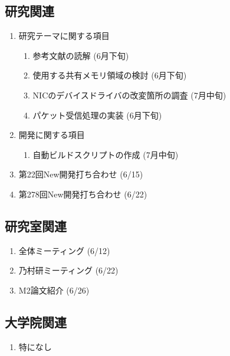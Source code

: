 \documentclass[fleqn, 14pt]{extarticle}
\begin{document}
\subsection{研究関連}
\label{sec-4-1}

\begin{enumerate}

\item 研究テーマに関する項目
\hfill
\begin{enumerate}


\item 参考文献の読解
\hfill
(6月下旬)

\item 使用する共有メモリ領域の検討
\hfill
(6月下旬)

\item NICのデバイスドライバの改変箇所の調査
\hfill
(7月中旬)

\item パケット受信処理の実装
\hfill
(6月下旬)
\end{enumerate}
\item 開発に関する項目
\hfill
\begin{enumerate}

\item 自動ビルドスクリプトの作成
\hfill
(7月中旬)

\end{enumerate}

\item 第22回New開発打ち合わせ
\hfill
\label{enum-7}
(6/15)

\item 第278回New開発打ち合わせ
\hfill
\label{enum-7}
(6/22)
\end{enumerate}
\subsection{研究室関連}
\label{sec-4-2}

\begin{enumerate}

\item 全体ミーティング
\hfill
\label{enum-18}
(6/12)

\item 乃村研ミーティング 
\hfill
\label{enum-18}
(6/22)

\item M2論文紹介
\hfill
\label{enum-18}
(6/26)

\end{enumerate}

\subsection{大学院関連}
\begin{enumerate}

\item 特になし
\hfill
\label{enum-17}


\end{enumerate}
\end{document}
